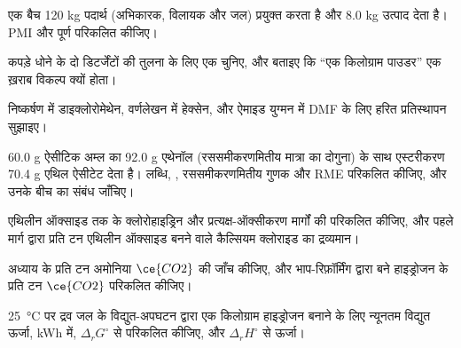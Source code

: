 \begin{exercise}[$\star$]\label{exo:b3:green-industrial:2}
एक बैच 120 kg पदार्थ (अभिकारक, विलायक और जल) प्रयुक्त करता है और 8.0 kg
उत्पाद देता है। PMI और पूर्ण  परिकलित कीजिए।
\end{exercise}

\begin{exercise}[$\star$]\label{exo:b3:green-industrial:3}
कपड़े धोने के दो डिटर्जेंटों की तुलना के लिए एक  चुनिए, और बताइए कि
``एक किलोग्राम पाउडर'' एक ख़राब विकल्प क्यों होता।
\end{exercise}

\begin{exercise}[$\star$]\label{exo:b3:green-industrial:4}
निष्कर्षण में डाइक्लोरोमेथेन, वर्णलेखन में हेक्सेन, और ऐमाइड युग्मन में DMF के
लिए हरित प्रतिस्थापन सुझाइए।
\end{exercise}

\begin{exercise}[$\star\star$]\label{exo:b3:green-industrial:5}
60.0 g ऐसीटिक अम्ल का 92.0 g एथेनॉल (रससमीकरणमितीय मात्रा का
दोगुना) के साथ एस्टरीकरण 70.4 g एथिल ऐसीटेट देता है। लब्धि, , रससमीकरणमितीय गुणक और RME परिकलित कीजिए, और उनके बीच का संबंध
जाँचिए।
\end{exercise}

\begin{exercise}[$\star\star$]\label{exo:b3:green-industrial:6}
एथिलीन ऑक्साइड तक के क्लोरोहाइड्रिन और प्रत्यक्ष-ऑक्सीकरण मार्गों की 
परिकलित कीजिए, और पहले मार्ग द्वारा प्रति टन एथिलीन ऑक्साइड बनने वाले कैल्सियम क्लोराइड
का द्रव्यमान।
\end{exercise}

\begin{exercise}[$\star\star$]\label{exo:b3:green-industrial:7}
अध्याय के प्रति टन अमोनिया $\ce{CO2}$ की जाँच कीजिए, और भाप-रिफ़ॉर्मिंग द्वारा बने
हाइड्रोजन के प्रति टन $\ce{CO2}$ परिकलित कीजिए।
\end{exercise}

\begin{exercise}[$\star\star$]\label{exo:b3:green-industrial:8}
\qty{25}{\celsius} पर द्रव जल के विद्युत-अपघटन द्वारा एक किलोग्राम हाइड्रोजन बनाने के लिए न्यूनतम
विद्युत ऊर्जा, kWh में, $\Delta_rG^\circ$ से परिकलित कीजिए, और $\Delta_rH^\circ$ से ऊर्जा।
\end{exercise}

